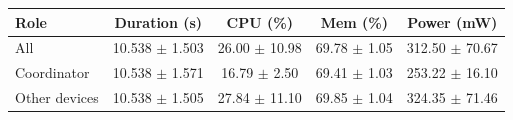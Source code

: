 \begin{tabular}{lcccc}
\hline
\textbf{Role} & \textbf{Duration (s)} & \textbf{CPU (\%)} & \textbf{Mem (\%)} & \textbf{Power (mW)} \\
\hline
All & 10.538 $\pm$ 1.503 & 26.00 $\pm$ 10.98 & 69.78 $\pm$ 1.05 & 312.50 $\pm$ 70.67 \\
Coordinator & 10.538 $\pm$ 1.571 & 16.79 $\pm$ 2.50 & 69.41 $\pm$ 1.03 & 253.22 $\pm$ 16.10 \\
Other devices & 10.538 $\pm$ 1.505 & 27.84 $\pm$ 11.10 & 69.85 $\pm$ 1.04 & 324.35 $\pm$ 71.46 \\
\hline
\end{tabular}
